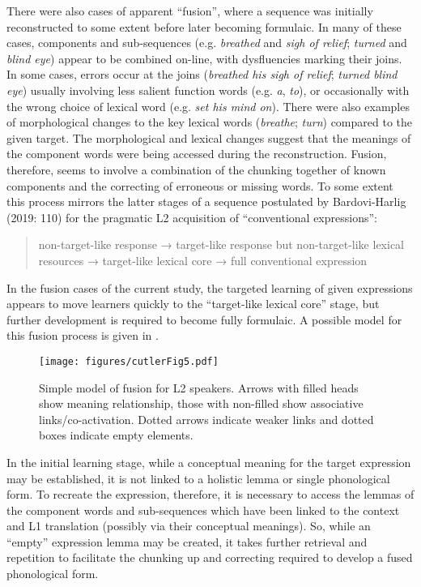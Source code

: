 \documentclass[output=paper]{langscibook}
\begin{document}
There were also cases of apparent ``fusion'', where a sequence was initially reconstructed to some extent before later becoming formulaic. In many of these cases, components and sub-sequences (e.g. \textit{breathed} and \textit{sigh of relief}; \textit{turned} and \textit{blind eye}) appear to be combined on-line, with dysfluencies marking their joins. In some cases, errors occur at the joins (\textit{breathed his sigh of relief}; \textit{turned blind eye}) usually involving less salient function words (e.g. \textit{a}, \textit{to}), or occasionally with the wrong choice of lexical word (e.g. \textit{set his mind on}). There were also examples of morphological changes to the key lexical words (\textit{breathe}; \textit{turn}) compared to the given target. The morphological and lexical changes suggest that the meanings of the component words were being accessed during the reconstruction. Fusion, therefore, seems to involve a combination of the chunking together of known components and the correcting of erroneous or missing words. To some extent this process mirrors the latter stages of a sequence postulated by Bardovi-Harlig (2019: 110) for the pragmatic L2 acquisition of ``conventional expressions'': 

\begin{quote}
non-target-like response → target-like response but non-target-like lexical resources → target-like lexical core → full conventional expression
\end{quote}

In the fusion cases of the current study, the targeted learning of given expressions appears to move learners quickly to the ``target-like lexical core'' stage, but further development is required to become fully formulaic. A possible model for this fusion process is given in .


\begin{figure}
\texttt{[image: figures/cutlerFig5.pdf]}
\caption{Simple model of fusion for L2 speakers. Arrows with filled heads show meaning relationship, those with non-filled show associative links\slash co-activation. Dotted arrows indicate weaker links and dotted boxes indicate empty elements.\label{fig:cutler:5}}
\end{figure}


In the initial learning stage, while a conceptual meaning for the target expression may be established, it is not linked to a holistic lemma or single phonological form. To recreate the expression, therefore, it is necessary to access the lemmas of the component words and sub-sequences which have been linked to the context and L1 translation (possibly via their conceptual meanings).  So, while an ``empty'' expression lemma may be created, it takes further retrieval and repetition to facilitate the chunking up and correcting required to develop a fused phonological form. 
\end{document}
